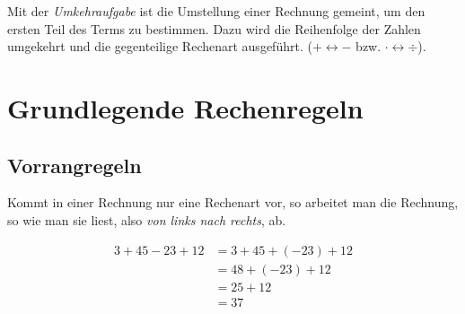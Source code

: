 \begin{defi}[Umkehraufgabe]
 Mit der \emph{Umkehraufgabe} ist die Umstellung einer Rechnung gemeint, um den ersten Teil des Terms zu bestimmen. Dazu wird die Reihenfolge der Zahlen umgekehrt und die gegenteilige Rechenart ausgeführt. (\(+\leftrightarrow -\) bzw. \(\cdot \leftrightarrow \div\)).
\end{defi}


\section{Grundlegende Rechenregeln}
\label{sec:basicrules}

\subsection*{Vorrangregeln}

\begin{regel}
 Kommt in einer Rechnung nur eine Rechenart vor, so arbeitet man die Rechnung, so wie man sie liest, also \emph{von links nach rechts}, ab.
\end{regel}

\begin{bsp}

\begin{align*}
 3+45-23+12 &=3+45+(-23)+12 \\
  &= 48 + (-23) + 12 \\
  &= 25+12 \\
  &= 37
\end{align*}

 \begin{center}
 \small
\normalsize
 \end{center}

\end{bsp}

